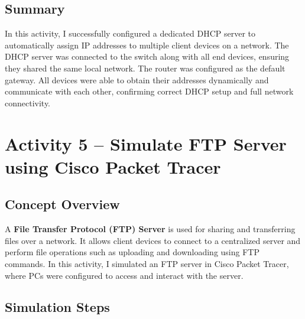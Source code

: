 \documentclass[11pt,a4paper]{article}
\begin{document}
\subsection{Summary}

In this activity, I successfully configured a dedicated DHCP server to automatically assign IP addresses to multiple client devices on a network. The DHCP server was connected to the switch along with all end devices, ensuring they shared the same local network. The router was configured as the default gateway. All devices were able to obtain their addresses dynamically and communicate with each other, confirming correct DHCP setup and full network connectivity.

\section{Activity 5 – Simulate FTP Server using Cisco Packet Tracer}

\subsection{Concept Overview}

A \textbf{File Transfer Protocol (FTP) Server} is used for sharing and transferring files over a network. It allows client devices to connect to a centralized server and perform file operations such as uploading and downloading using FTP commands. In this activity, I simulated an FTP server in Cisco Packet Tracer, where PCs were configured to access and interact with the server.

\subsection{Simulation Steps}
\end{document}
